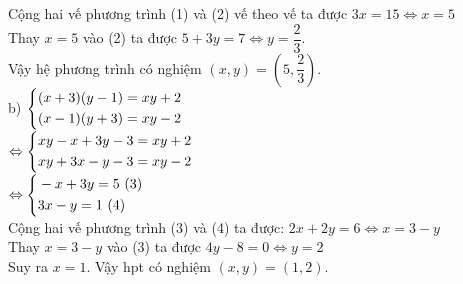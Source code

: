 \begin{ex}
{\begin{enumerate}[1.]
		Cộng hai vế phương trình (1) và (2) vế theo vế ta được $3x=15\Leftrightarrow x=5$\\
		Thay $x=5$ vào (2) ta được $5+3y=7\Leftrightarrow y=\dfrac{2}{3}$.\\
		Vậy hệ phương trình có nghiệm $(x,y)=\left( 5,\dfrac{2}{3}\right)$.\\
		b) $\left\{\begin{aligned}&(x+3)(y-1)=xy+2 \\ &(x-1)(y+3)=xy-2\end{aligned}\right.$\\
		$\Leftrightarrow \left\{\begin{aligned}&xy-x+3y-3=xy+2 \\ &xy+3x-y-3=xy-2\end{aligned}\right.$\\
		$\Leftrightarrow \left\{\begin{aligned}&-x+3y=5\ (3) \\ &3x-y=1\ (4)\end{aligned}\right.$\\
		Cộng hai vế phương trình (3) và (4) ta được:
		$2x+2y=6\Leftrightarrow x=3-y$\\ 
		Thay $x=3-y$ vào (3) ta được $4y-8=0\Leftrightarrow y=2$\\
		Suy ra $x=1$.
		Vậy hpt có nghiệm $(x,y)=(1,2)$.
	\end{enumerate}
}
\end{ex}
